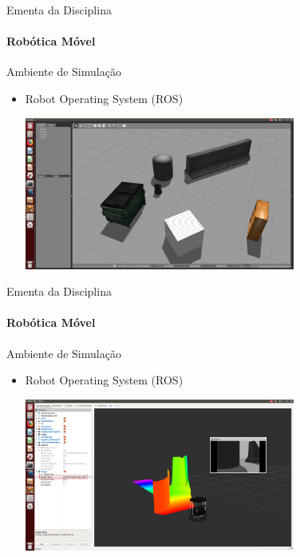 \documentclass{beamer}
\begin{document}
\begin{frame}[t]{Ementa da Disciplina}
	\framesubtitle{Robótica Móvel}
	\begin{block}{Ambiente de Simulação}
	\end{block}

	\begin{itemize}
		\item  Robot Operating System (ROS)
		      \begin{center}
			      \includegraphics[width=0.7\textwidth]{./images/ros_example.png}
		      \end{center}
	\end{itemize}
\end{frame}




\begin{frame}[t]{Ementa da Disciplina}
	\framesubtitle{Robótica Móvel}
	\begin{block}{Ambiente de Simulação}
	\end{block}

	\begin{itemize}
		\item  Robot Operating System (ROS)
		      \begin{center}
			      \includegraphics[width=0.7\textwidth]{./images/ros_example_2.png}
		      \end{center}
	\end{itemize}
\end{frame}
\end{document}
